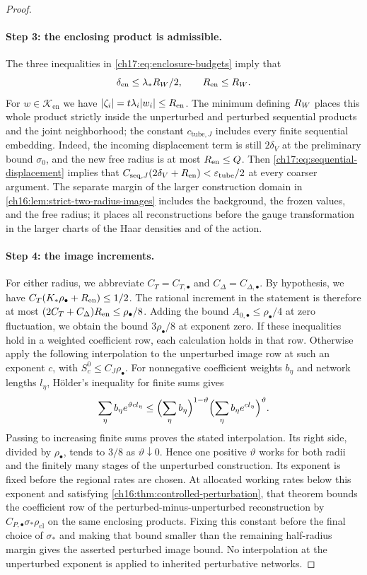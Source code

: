 \begin{proof}
\paragraph{Step 3: the enclosing product is admissible.}
The three inequalities in \eqref{ch17:eq:enclosure-budgets} imply that
\[
 \delta_{\mathrm{en}}\le\lambda_*R_W/2,\qquad R_{\mathrm{en}}\le R_W.
\]
For $w\in\mathcal K_{\mathrm{en}}$ we have $\lvert \zeta_i\rvert=t\lambda_i\lvert w_i\rvert\le R_{\mathrm{en}}$. The minimum defining $R_W$ places this whole product strictly inside the unperturbed and perturbed sequential products and the joint neighborhood; the constant $c_{\mathrm{tube},J}$ includes every finite sequential embedding. Indeed, the incoming displacement term is still $2\delta_V$ at the preliminary bound $\sigma_0$, and the new free radius is at most $R_{\mathrm{en}}\le Q$. Then \eqref{ch17:eq:sequential-displacement} implies that $C_{\mathrm{seq},J}(2\delta_V+R_{\mathrm{en}})<\varepsilon_{\mathrm{tube}}/2$ at every coarser argument. The separate margin of the larger construction domain in \cref{ch16:lem:strict-two-radius-images} includes the background, the frozen values, and the free radius; it places all reconstructions before the gauge transformation in the larger charts of the Haar densities and of the action.

\paragraph{Step 4: the image increments.}
For either radius, we abbreviate $C_T=C_{T,\bullet}$ and $C_\Delta=C_{\Delta,\bullet}$. By hypothesis, we have $C_T(K_*\rho_\bullet+R_{\mathrm{en}})\le1/2$. The rational increment in the statement is therefore at most $(2C_T+C_\Delta)R_{\mathrm{en}}\le\rho_\bullet/8$. Adding the bound $A_{0,\bullet}\le\rho_\bullet/4$ at zero fluctuation, we obtain the bound $3\rho_\bullet/8$ at exponent zero. If these inequalities hold in a weighted coefficient row, each calculation holds in that row. Otherwise apply the following interpolation to the unperturbed image row at such an exponent $c$, with $S_c^0\le C_J\rho_\bullet$. For nonnegative coefficient weights $b_\eta$ and network lengths $l_\eta$, H\"older's inequality for finite sums gives
\[
 \sum_\eta b_\eta e^{\vartheta cl_\eta}\le\Bigl(\sum_\eta b_\eta\Bigr)^{1-\vartheta}\Bigl(\sum_\eta b_\eta e^{cl_\eta}\Bigr)^\vartheta.
\]
Passing to increasing finite sums proves the stated interpolation. Its right side, divided by $\rho_\bullet$, tends to $3/8$ as $\vartheta\downarrow0$. Hence one positive $\vartheta$ works for both radii and the finitely many stages of the unperturbed construction. Its exponent is fixed before the regional rates are chosen. At allocated working rates below this exponent and satisfying \cref{ch16:thm:controlled-perturbation}, that theorem bounds the coefficient row of the perturbed-minus-unperturbed reconstruction by $C_{P,\bullet}\sigma_*\rho_{\mathrm{cl}}$ on the same enclosing products. Fixing this constant before the final choice of $\sigma_*$ and making that bound smaller than the remaining half-radius margin gives the asserted perturbed image bound. No interpolation at the unperturbed exponent is applied to inherited perturbative networks.


\end{proof}
